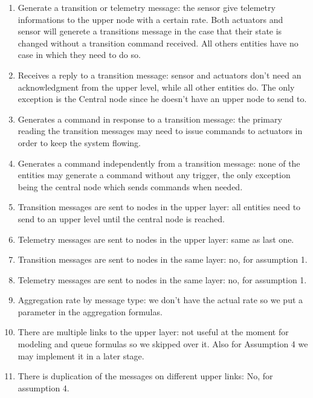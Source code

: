 \documentclass[11pt]{article}
\begin{document}
\begin{enumerate}
\item Generate a transition or telemetry message: the sensor give telemetry informations to the upper node with a certain rate. Both actuators and sensor will generete a transitions message in the case that their state is changed without a transition command received. All others entities have no case in which they need to do so.
\item Receives a reply to a transition message: sensor and actuators don't need an acknowledgment from the upper level, while all other entities do. The only exception is the Central node since he doesn't have an upper node to send to.
\item Generates a command in response to a transition message: the primary reading the transition messages may need to issue commands to actuators in order to keep the system flowing.
\item Generates a command independently from a transition message: none of the entities may generate a command without any trigger, the only exception being the central node which sends commands when needed.
\item Transition messages are sent to nodes in the upper layer: all entities need to send to an upper level until the central node is reached.
\item Telemetry messages are sent to nodes in the upper layer: same as last one.
\item Transition messages are sent to nodes in the same layer: no, for assumption 1.
\item Telemetry messages are sent to nodes in the same layer: no, for assumption 1.
\item Aggregation rate by message type: we don't have the actual rate so we put a parameter in the aggregation formulas.
\item There are multiple links to the upper layer: not useful at the moment for modeling and queue formulas so we skipped over it. Also for Assumption 4 we may implement it in a later stage.
\item There is duplication of the messages on different upper links: No, for assumption 4.
\end{enumerate}
\end{document}

